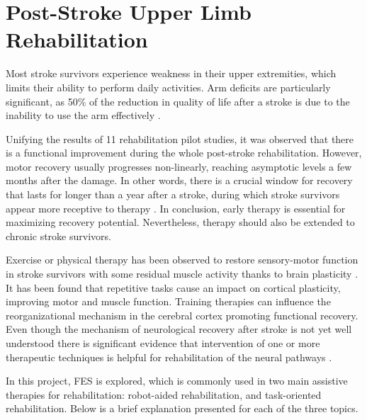 \section{Post-Stroke Upper Limb Rehabilitation}

Most stroke survivors experience weakness in their upper extremities, which limits their ability to perform daily activities. Arm deficits are particularly significant, as 50\% of the reduction in quality of life after a stroke is due to the inability to use the arm effectively \cite{UEFSS}. 

Unifying the results of 11 rehabilitation pilot studies, it was observed that there is a functional improvement during the whole post-stroke rehabilitation. However, motor recovery usually progresses non-linearly, reaching asymptotic levels a few months after the damage. In other words, there is a crucial window for recovery that lasts for longer than a year after a stroke, during which stroke survivors appear more receptive to therapy \cite{Ballester2019}. In conclusion, early therapy is essential for maximizing recovery potential. Nevertheless, therapy should also be extended to chronic stroke survivors.

Exercise or physical therapy has been observed to restore sensory-motor function in stroke survivors with some residual muscle activity thanks to brain plasticity \cite{Beekhuizen2005}. It has been found that repetitive tasks cause an impact on cortical plasticity, improving motor and muscle function. Training therapies can influence the reorganizational mechanism in the cerebral cortex promoting functional recovery. Even though the mechanism of neurological recovery after stroke is not yet well understood there is significant evidence that intervention of one or more therapeutic techniques is helpful for rehabilitation of the neural pathways \cite{Masiero2008}.

In this project, FES is explored, which is commonly used in two main assistive therapies for rehabilitation: robot-aided rehabilitation, and task-oriented rehabilitation. Below is a brief explanation presented for each of the three topics.

